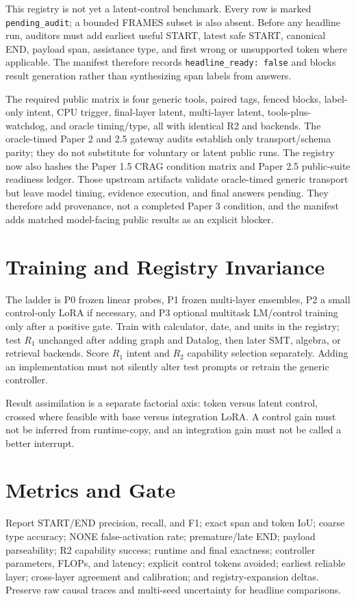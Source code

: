 \documentclass[10pt]{article}
\begin{document}
This registry is not yet a latent-control benchmark. Every row is marked
\texttt{pending\_audit}; a bounded FRAMES subset is also absent. Before any
headline run, auditors must add earliest useful START, latest safe START,
canonical END, payload span, assistance type, and first wrong or unsupported
token where applicable. The manifest therefore records
\texttt{headline\_ready: false} and blocks result generation rather than
synthesizing span labels from answers.

The required public matrix is four generic tools, paired tags, fenced blocks,
label-only intent, CPU trigger, final-layer latent, multi-layer latent,
tools-plus-watchdog, and oracle timing/type, all with identical R2 and backends.
The oracle-timed Paper 2 and 2.5 gateway audits establish only transport/schema
parity; they do not substitute for voluntary or latent public runs.
The registry now also hashes the Paper 1.5 CRAG condition matrix and Paper 2.5
public-suite readiness ledger. Those upstream artifacts validate oracle-timed
generic transport but leave model timing, evidence execution, and final answers
pending. They therefore add provenance, not a completed Paper 3 condition, and
the manifest adds matched model-facing public results as an explicit blocker.

\section{Training and Registry Invariance}
The ladder is P0 frozen linear probes, P1 frozen multi-layer ensembles, P2 a
small control-only LoRA if necessary, and P3 optional multitask LM/control
training only after a positive gate. Train with calculator, date, and units in
the registry; test $R_1$ unchanged after adding graph and Datalog, then later
SMT, algebra, or retrieval backends. Score $R_1$ intent and $R_2$ capability
selection separately. Adding an implementation must not silently alter test
prompts or retrain the generic controller.

Result assimilation is a separate factorial axis: token versus latent control,
crossed where feasible with base versus integration LoRA. A control gain must
not be inferred from runtime-copy, and an integration gain must not be called a
better interrupt.

\section{Metrics and Gate}
Report START/END precision, recall, and F1; exact span and token IoU; coarse type
accuracy; NONE false-activation rate; premature/late END; payload parseability;
R2 capability success; runtime and final exactness; controller parameters,
FLOPs, and latency; explicit control tokens avoided; earliest reliable layer;
cross-layer agreement and calibration; and registry-expansion deltas. Preserve
raw causal traces and multi-seed uncertainty for headline comparisons.
\end{document}
